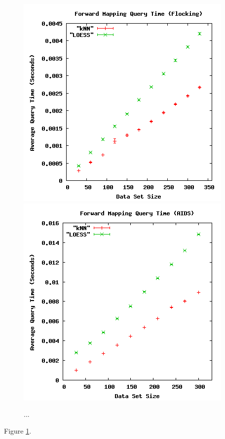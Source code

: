 \begin{figure}[ht]
\centering
\includegraphics[scale=.4]{images/results_flocking/fmquery.png}
\includegraphics[scale=.4]{images/results_aids/aids-fmquery.png}
\caption{...}
\label{fig:fmquery}
\end{figure}

Figure \ref{fig:fmquery}.



